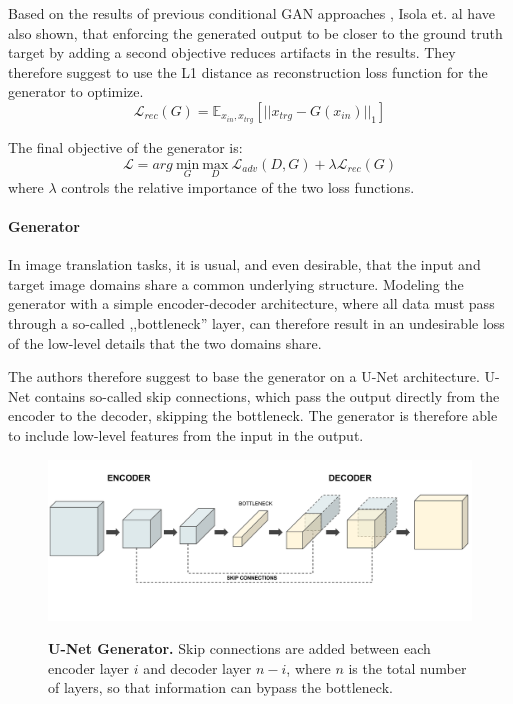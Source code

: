 \documentclass[12pt]{report}
\begin{document}
\pagebreak
Based on the results of previous conditional GAN approaches \cite{pathak_context_2016}, Isola et. al \cite{isola_image--image_2016} have also shown, that enforcing the generated output to be closer to the ground truth target by adding a second objective reduces artifacts in the results. They therefore suggest to use the L1 distance as reconstruction loss function for the generator to optimize.
\begin{equation}
\mathcal{L}_{rec}(G) = \mathbb{E}_{x_{in},x_{trg}}[||x_{trg}-G(x_{in})||_{1}]
\label{eq:pix2pix_loss_rec}
\end{equation}

The final objective of the generator is:
\begin{equation}
\mathcal{L} = arg \ \underset{G}{\mathrm{min}} \ \underset{D}{\mathrm{max}} \ \mathcal{L}_{adv}(D,G) + \lambda \mathcal{L}_{rec}(G)
\end{equation}
where $\lambda$ controls the relative importance of the two loss functions.


\paragraph{Generator}
In image translation tasks, it is usual, and even desirable, that the input and target image domains share a common underlying structure. Modeling the generator with a simple encoder-decoder architecture, where all data must pass through a so-called ,,bottleneck'' layer, can therefore result in an undesirable loss of the low-level details that the two domains share. 

The authors therefore suggest to base the generator on a U-Net architecture. U-Net contains so-called skip connections, which pass the output directly from the encoder to the decoder, skipping the bottleneck. The generator is therefore able to include low-level features from the input in the output.

\begin{figure}[h]
\centering
{\includegraphics[width=\linewidth]{03_analysis/gans/u-net}}
\caption{\label{fig:u-net} \textbf{U-Net Generator.} Skip connections are added between each encoder layer $i$ and decoder layer $n - i$, where $n$ is the total number of layers, so that information can bypass the bottleneck.}
\end{figure}
\end{document}
